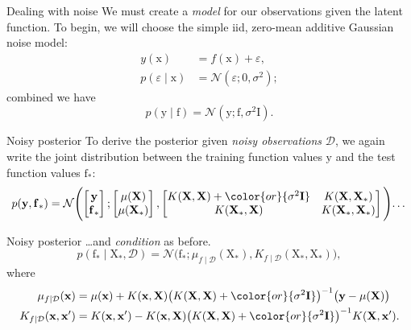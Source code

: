 \documentclass[xcolor={dvipsnames},hyperref={breaklinks=true},12pt]{beamer}
\newcommand{\given}{\mid}
\newcommand{\mc}[1]{\mathcal{#1}}
\newcommand{\data}{\mc{D}}
\newcommand{\inv}{^{-1}}
\newcommand{\mat}[1]{\bm{\mathrm{#1}}}
\renewcommand{\vec}[1]{\bm{\mathrm{#1}}}
\newcommand{\emphr}[1]{{\textcolor{or}{\itshape #1}}}
\newcommand{\maker}[1]{{\color{or}{#1}}}
\begin{document}
\begin{frame}{Dealing with noise}
  We must create a \emphr{model} for our observations given the latent
  function.  To begin, we will choose the simple iid, zero-mean
  additive Gaussian noise model:
  \begin{align*}
    y(\vec{x}) &= f(\vec{x}) + \varepsilon,
    \\ p(\varepsilon \given \vec{x}) &= \mc{N}(\varepsilon; 0, \sigma^2);
  \end{align*}
  combined we have
  \begin{equation*}
    p(\vec{y} \given \vec{f}) = \mc{N}(\vec{y}; \vec{f}, \sigma^2\mat{I}).
  \end{equation*}
\end{frame}

\begin{frame}{Noisy posterior}
  To derive the posterior given \emphr{noisy observations} $\data$, we
  again write the joint distribution between the training function
  values $\vec{y}$ and the test function values $\vec{f}_\ast$:
  \begin{equation}
    p(\vec{y}, \vec{f}_\ast) =
    \mc{N}\Biggl(
    \begin{bmatrix} \vec{y} \\ \vec{f}_\ast \end{bmatrix};
    \begin{bmatrix} \mu(\mat{X}) \\ \mu(\mat{X}_\ast) \end{bmatrix},
    \begin{bmatrix} K(\mat{X}, \mat{X}) + \maker{\sigma^2 \vec{I}} & K(\mat{X}, \mat{X}_\ast) \\ K(\mat{X}_\ast, \mat{X}) & K(\mat{X}_\ast, \mat{X}_\ast) \end{bmatrix}
    \Biggl)\dotsc
  \end{equation}
\end{frame}

\begin{frame}{Noisy posterior}
  \dots and \emphr{condition} as before.
  \begin{equation*}
    p(\vec{f}_\ast \given \mat{X}_\ast, \data) =
    \mc{N}
    \bigl(
    \vec{f}_\ast;
    \mu_{f \given \data}(\mat{X}_\ast)
    ,
    K_{f \given \data}(\mat{X}_\ast, \mat{X}_\ast)
    \bigr),
  \end{equation*}
  where
  \begin{align*}
    \mu_{f \given \data}(\vec{x})
    &=
    \mu(\vec{x}) +
    K(\vec{x}, \mat{X})
    \bigl(K(\mat{X}, \mat{X}) + \maker{\sigma^2 \vec{I}}\bigr)\inv
    \bigl(\vec{y} - \mu(\mat{X})\bigr)
    \\
    K_{f \given \data}(\vec{x}, \vec{x}')
    &=
    K(\vec{x}, \vec{x}')
    -
    K(\vec{x}, \mat{X})
    \bigl(K(\mat{X}, \mat{X}) + \maker{\sigma^2 \vec{I}}\bigr)\inv
    K(\mat{X}, \vec{x}').
  \end{align*}
\end{frame}
\end{document}
